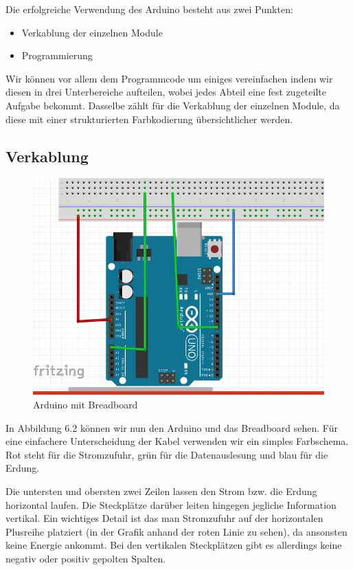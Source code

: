 Die erfolgreiche Verwendung des Arduino besteht aus zwei  Punkten:
\begin{itemize}
	\item Verkablung der einzelnen Module 
	\item Programmierung
\end{itemize}

Wir können vor allem dem Programmcode um einiges vereinfachen indem wir diesen in drei Unterbereiche aufteilen, wobei jedes Abteil eine fest zugeteilte Aufgabe bekommt. Dasselbe zählt für die Verkablung der einzelnen Module, da diese mit einer strukturierten Farbkodierung übersichtlicher werden.


\subsection{Verkablung}
\begin{figure}[h]
	
	\includegraphics[width=0.7\linewidth]{figures/VerkablungStrukturplan.png}
	\caption{Arduino mit Breadboard}
	\label{fig:verkablungstrukturplan}
\end{figure}

In Abbildung 6.2 können wir nun den Arduino und das Breadboard sehen.  Für eine einfachere Unterscheidung der Kabel verwenden wir ein simples Farbschema. Rot steht für die Stromzufuhr, grün für die Datenauslesung und blau für die Erdung.


Die untersten und obersten zwei Zeilen lassen den Strom bzw. die Erdung horizontal laufen.  Die Steckplätze darüber leiten hingegen jegliche Information vertikal. Ein wichtiges Detail ist das man Stromzufuhr auf der horizontalen Plusreihe platziert (in der Grafik anhand der roten Linie zu sehen), da ansonsten keine Energie ankommt. Bei den vertikalen Steckplätzen gibt es allerdings keine negativ oder positiv gepolten Spalten.

